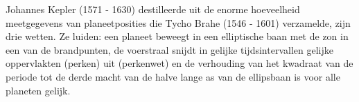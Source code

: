 \documentclass{ximera}
\begin{document}
	\author{Bart Lambregs}
    \xmsource\xmuitleg

	

Johannes Kepler (1571 - 1630) destilleerde uit de enorme hoeveelheid meetgegevens van planeetposities die Tycho Brahe (1546 - 1601) verzamelde, zijn drie wetten. Ze luiden: een planeet beweegt in een elliptische baan met de zon in een van de brandpunten, de voerstraal snijdt in gelijke tijdsintervallen gelijke oppervlakten (perken) uit (perkenwet) en de verhouding van het kwadraat van de periode tot de derde macht van de halve lange as van de ellipsbaan is voor alle planeten gelijk.
	
	
\end{document}
